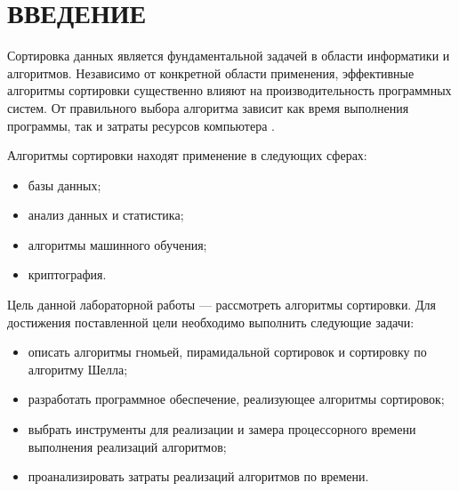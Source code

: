 \chapter*{ВВЕДЕНИЕ}

Сортировка данных является фундаментальной задачей в области информатики и алгоритмов. 
Независимо от конкретной области применения, эффективные алгоритмы сортировки существенно влияют на производительность программных систем. 
От правильного выбора алгоритма зависит как время выполнения программы, так и затраты ресурсов компьютера \cite{knut}.

Алгоритмы сортировки находят применение в следующих сферах:
\begin{itemize}
	\item базы данных;
	\item анализ данных и статистика;
	\item алгоритмы машинного обучения;
	\item криптография.
\end{itemize}

Цель данной лабораторной работы --- рассмотреть алгоритмы сортировки.
Для достижения поставленной цели необходимо выполнить следующие задачи:
\begin{itemize}
	\item описать алгоритмы гномьей, пирамидальной сортировок и сортировку по алгоритму Шелла;
	\item разработать программное обеспечение, реализующее алгоритмы сортировок;
	\item выбрать инструменты для реализации и замера процессорного времени
	выполнения реализаций алгоритмов;
	\item проанализировать затраты реализаций алгоритмов по времени.
\end{itemize}
